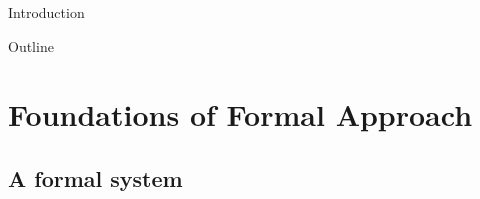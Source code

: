 \documentclass[aspectratio=169, fleqn]{beamer}
\begin{document}
\begin{frame}{Introduction}
\begin{figure}
\end{figure}
\end{frame}

\begin{frame}{Outline}
  \tableofcontents
\end{frame}

\section{Foundations of Formal Approach}

\subsection{A formal system}
\end{document}
